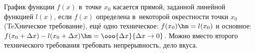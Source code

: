 
    График функции $f(x)$ в~точке $x_0$ касается прямой, заданной линейной функцией $l(x)$, если $f(x)$ определена в~некоторой окрестности
    точки $x_0$ (\TeX{ническое} требование), ещё одно техническое: $f(x_0)\hm=l(x_0)$ и основное:
    $f(x_0+\Delta x)-l(x_0+\Delta x)\hm=\ooo{\Delta x}{\Delta x\to0}$. Можно вместо второго технического требования требовать непрерывность, дело вкуса.
